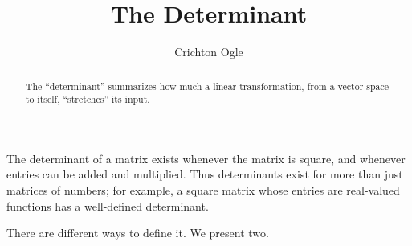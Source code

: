 \documentclass{ximera}
\title{The Determinant}
\author{Crichton Ogle}
\begin{document}
\begin{abstract}
  The ``determinant'' summarizes how much a linear transformation,
  from a vector space to itself, ``stretches'' its input.
\end{abstract}
\maketitle

The determinant of a matrix exists whenever the matrix is square, and
whenever entries can be added and multiplied. Thus determinants exist
for more than just matrices of numbers; for example, a square matrix
whose entries are real-valued functions has a well-defined
determinant.

There are different ways to define it. We present two.
\end{document}
